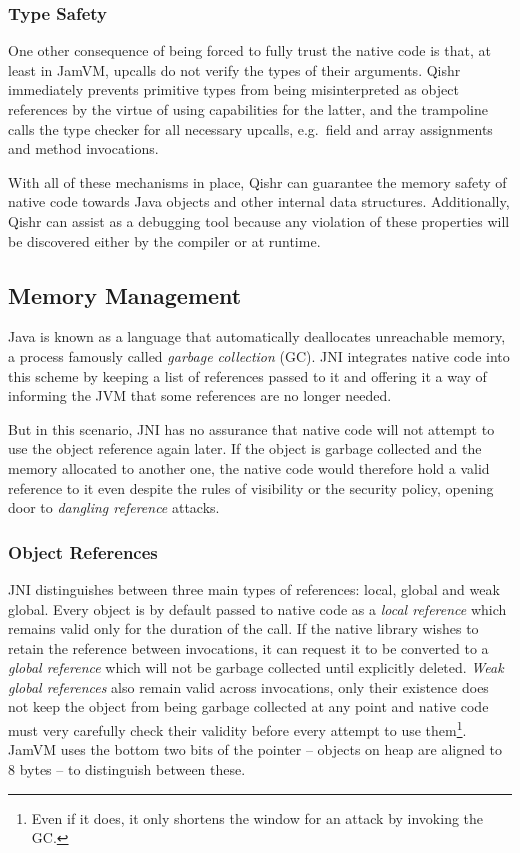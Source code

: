 \documentclass[a4paper,12pt,twoside,openright]{report}
\begin{document}
\subsubsection{Type Safety}

One other consequence of being forced to fully trust the native code is that, at least in JamVM, upcalls do not verify the types of their arguments. Qishr immediately prevents primitive types from being misinterpreted as object references by the virtue of using capabilities for the latter, and the trampoline calls the type checker for all necessary upcalls, e.g.\ field and array assignments and method invocations.

With all of these mechanisms in place, Qishr can guarantee the memory safety of native code towards Java objects and other internal data structures. Additionally, Qishr can assist as a debugging tool because any violation of these properties will be discovered either by the compiler or at runtime.

\subsection{Memory Management}

Java is known as a language that automatically deallocates unreachable memory, a process famously called \emph{garbage collection} (GC). JNI integrates native code into this scheme by keeping a list of references passed to it and offering it a way of informing the JVM that some references are no longer needed. 

But in this scenario, JNI has no assurance that native code will not attempt to use the object reference again later. If the object is garbage collected and the memory allocated to another one, the native code would therefore hold a valid reference to it even despite the rules of visibility or the security policy, opening door to \emph{dangling reference} attacks.

\subsubsection{Object References}
\label{sec:LocalAndGlobalRefs}

JNI distinguishes between three main types of references: local, global and weak global. Every object is by default passed to native code as a \emph{local reference} which remains valid only for the duration of the call. If the native library wishes to retain the reference between invocations, it can request it to be converted to a \emph{global reference} which will not be garbage collected until explicitly deleted. \emph{Weak global references} also remain valid across invocations, only their existence does not keep the object from being garbage collected at any point and native code must very carefully check their validity before every attempt to use them\footnote{Even if it does, it only shortens the window for an attack by invoking the GC.}. JamVM uses the bottom two bits of the pointer -- objects on heap are aligned to 8 bytes -- to distinguish between these.
\end{document}
